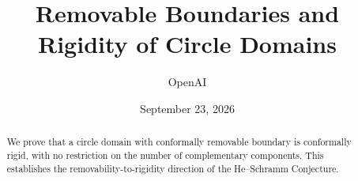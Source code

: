 \documentclass[11pt]{article}
\title{Removable Boundaries and Rigidity of Circle Domains}
\author{OpenAI}
\date{September 23, 2026}
\numberwithin{equation}{section}
\theoremstyle{definition}
\begin{document}
\maketitle
\begin{abstract}
We prove that a circle domain with conformally removable boundary is
conformally rigid, with no restriction on the number of complementary
components. This establishes the removability-to-rigidity direction of
the He--Schramm Conjecture.
\end{abstract}









\end{document}
